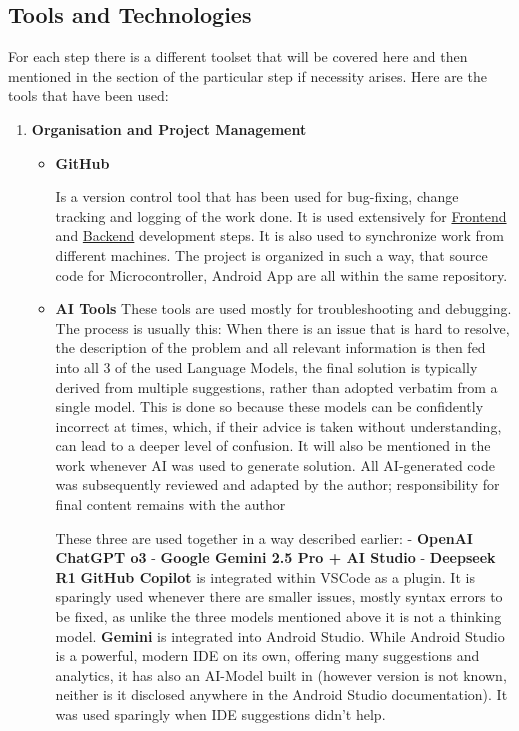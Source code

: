 \subsection{Tools and Technologies}
For each step there is a different toolset that will be covered here and then mentioned in the section of the particular step if necessity arises. Here are the tools that have been used:

\begin{enumerate}
	\item\textbf{Organisation and Project Management}
	\begin{itemize}
		\item\textbf{GitHub}
		
		Is a version control tool that has been used for bug-fixing, change tracking and logging of the work done. It is used extensively for \hyperref[sec:FrontenddDev]{Frontend} and \hyperref[sec:Backenddev]{Backend} development steps. It is also used to synchronize work from different machines. The project is organized in such a way, that source code for Microcontroller, Android App are all within the same repository.
		\item\textbf{AI Tools}
		\newline These tools are used mostly for troubleshooting and debugging. The process is usually this: When there is an issue that is hard to resolve, the description of the problem and all relevant information is then fed into all 3 of the used Language Models, the final solution is typically derived from multiple suggestions, rather than adopted verbatim from a single model. This is done so because these models can be confidently incorrect at times, which, if their advice is taken without understanding, can lead to a deeper level of confusion. It will also be mentioned in the work whenever AI was used to generate solution. All AI-generated code was subsequently reviewed and adapted by the author; responsibility for final content remains with the author
		
		These three are used together in a way described earlier:
		\newline - \textbf{OpenAI ChatGPT o3}
		\newline - \textbf{Google Gemini 2.5 Pro + AI Studio}
		\newline - \textbf{Deepseek R1}
		\newline \textbf{GitHub Copilot} is integrated within \ac{VSCode} as a plugin. It is sparingly used whenever there are smaller issues, mostly syntax errors to be fixed, as unlike the three models mentioned above it is not a thinking model.
		\newline \textbf{Gemini} is integrated into Android Studio. While Android Studio is a powerful, modern \ac{IDE} on its own, offering many suggestions and analytics, it has also an AI-Model built in (however version is not known, neither is it disclosed anywhere in the Android Studio documentation). It was used sparingly when \ac{IDE} suggestions didn't help.
		

\end{itemize}
\end{enumerate}

